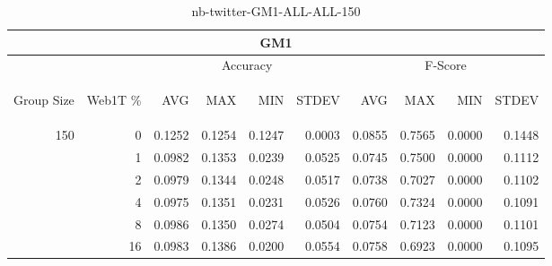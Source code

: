 \begin{center}
\begin{table}[htbp]
\begin{tabular}{ | r | r | r | r | r | r | r | r | r | r |}
\hline
\multicolumn{10}{|c|}{GM1}\\
\hline
 & & \multicolumn{4}{|c|}{Accuracy} & \multicolumn{4}{|c|}{F-Score}\\ \cline{3-10}
\begin{sideways}Group Size\end{sideways} & \begin{sideways}Web1T \%\end{sideways} & \begin{sideways}AVG\end{sideways} & \begin{sideways}MAX\end{sideways} & \begin{sideways}MIN\end{sideways} & \begin{sideways}STDEV\end{sideways} & \begin{sideways}AVG\end{sideways} & \begin{sideways}MAX\end{sideways} & \begin{sideways}MIN\end{sideways} & \begin{sideways}STDEV\end{sideways}\\
\hline
\multirow{5}{*}{150}
 & 0 & 0.1252 & 0.1254 & 0.1247 & 0.0003 & 0.0855 & 0.7565 & 0.0000 & 0.1448\\ \cline{2-10}
 & 1 & 0.0982 & 0.1353 & 0.0239 & 0.0525 & 0.0745 & 0.7500 & 0.0000 & 0.1112\\ \cline{2-10}
 & 2 & 0.0979 & 0.1344 & 0.0248 & 0.0517 & 0.0738 & 0.7027 & 0.0000 & 0.1102\\ \cline{2-10}
 & 4 & 0.0975 & 0.1351 & 0.0231 & 0.0526 & 0.0760 & 0.7324 & 0.0000 & 0.1091\\ \cline{2-10}
 & 8 & 0.0986 & 0.1350 & 0.0274 & 0.0504 & 0.0754 & 0.7123 & 0.0000 & 0.1101\\ \cline{2-10}
 & 16 & 0.0983 & 0.1386 & 0.0200 & 0.0554 & 0.0758 & 0.6923 & 0.0000 & 0.1095\\ \cline{2-10}
\hline
\end{tabular}
\caption{nb-twitter-GM1-ALL-ALL-150}
\label{table:nb-twitter-GM1-ALL-ALL-150}
\end{table}
\end{center}

